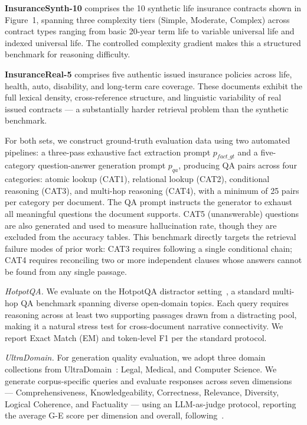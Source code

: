 \documentclass[runningheads]{llncs}
\begin{document}
\textbf{InsuranceSynth-10} comprises the 10 synthetic life insurance contracts shown in Figure~1, spanning three complexity tiers (Simple, Moderate, Complex) across contract types ranging from basic 20-year term life to variable universal life and indexed universal life. The controlled complexity gradient makes this a structured benchmark for reasoning difficulty.

\textbf{InsuranceReal-5} comprises five authentic issued insurance policies across life, health, auto, disability, and long-term care coverage. These documents exhibit the full lexical density, cross-reference structure, and linguistic variability of real issued contracts --- a substantially harder retrieval problem than the synthetic benchmark.

For both sets, we construct ground-truth evaluation data using two automated pipelines: a three-pass exhaustive fact extraction prompt $p_{fact\_gt}$ and a five-category question-answer generation prompt $p_{qa}$, producing QA pairs across four categories: atomic lookup (CAT1), relational lookup (CAT2), conditional reasoning (CAT3), and multi-hop reasoning (CAT4), with a minimum of 25 pairs per category per document. The QA prompt instructs the generator to exhaust all meaningful questions the document supports. CAT5 (unanswerable) questions are also generated and used to measure hallucination rate, though they are excluded from the accuracy tables. This benchmark directly targets the retrieval failure modes of prior work: CAT3 requires following a single conditional chain; CAT4 requires reconciling two or more independent clauses whose answers cannot be found from any single passage.

\textit{HotpotQA.} We evaluate on the HotpotQA distractor setting~\cite{yang2018hotpotqa}, a standard multi-hop QA benchmark spanning diverse open-domain topics. Each query requires reasoning across at least two supporting passages drawn from a distracting pool, making it a natural stress test for cross-document narrative connectivity. We report Exact Match (EM) and token-level F1 per the standard protocol.

\textit{UltraDomain.} For generation quality evaluation, we adopt three domain collections from UltraDomain~\cite{qian2024memorag}: Legal, Medical, and Computer Science. We generate corpus-specific queries and evaluate responses across seven dimensions --- Comprehensiveness, Knowledgeability, Correctness, Relevance, Diversity, Logical Coherence, and Factuality --- using an LLM-as-judge protocol, reporting the average G-E score per dimension and overall, following~\cite{luo2025hypergraphrag}.
\end{document}
